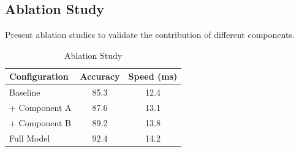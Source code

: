 \subsection{Ablation Study}
\label{subsec:ablation}

Present ablation studies to validate the contribution of different components.

\begin{table}[h]
\centering
\caption{Ablation Study}
\label{tab:ablation}
\begin{tabular}{lcc}
\toprule
Configuration & Accuracy & Speed (ms) \\
\midrule
Baseline & 85.3 & 12.4 \\
+ Component A & 87.6 & 13.1 \\
+ Component B & 89.2 & 13.8 \\
Full Model & 92.4 & 14.2 \\
\bottomrule
\end{tabular}
\end{table}
